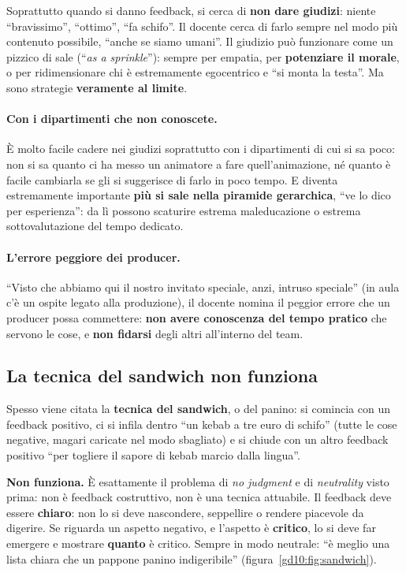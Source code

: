 Soprattutto quando si danno feedback, si cerca di \textbf{non dare
giudizi}: niente ``bravissimo'', ``ottimo'', ``fa schifo''. Il docente
cerca di farlo sempre nel modo più contenuto possibile, ``anche se siamo
umani''. Il giudizio può funzionare come un pizzico di sale (``\emph{as a
sprinkle}''): sempre per empatia, per \textbf{potenziare il morale}, o per
ridimensionare chi è estremamente egocentrico e ``si monta la testa''. Ma
sono strategie \textbf{veramente al limite}.

\paragraph{Con i dipartimenti che non conoscete.} È molto facile cadere nei
giudizi soprattutto con i dipartimenti di cui si sa poco: non si sa quanto
ci ha messo un animatore a fare quell'animazione, né quanto è facile
cambiarla se gli si suggerisce di farlo in poco tempo. E diventa
estremamente importante \textbf{più si sale nella piramide gerarchica}, ``ve
lo dico per esperienza'': da lì possono scaturire estrema maleducazione o
estrema sottovalutazione del tempo dedicato.

\paragraph{L'errore peggiore dei producer.} ``Visto che abbiamo qui il
nostro invitato speciale, anzi, intruso speciale'' (in aula c'è un
ospite legato alla produzione), il docente nomina il peggior errore che un
producer possa commettere: \textbf{non avere conoscenza del tempo pratico}
che servono le cose, e \textbf{non fidarsi} degli altri all'interno del team.

\subsection{La tecnica del sandwich non funziona}

Spesso viene citata la \textbf{tecnica del sandwich}, o del panino: si
comincia con un feedback positivo, ci si infila dentro ``un kebab a tre euro
di schifo'' (tutte le cose negative, magari caricate nel modo sbagliato) e si
chiude con un altro feedback positivo ``per togliere il sapore di kebab
marcio dalla lingua''.

\textbf{Non funziona.} È esattamente il problema di \emph{no judgment} e di
\emph{neutrality} visto prima: non è feedback costruttivo, non è una tecnica
attuabile. Il feedback deve essere \textbf{chiaro}: non lo si deve
nascondere, seppellire o rendere piacevole da digerire. Se riguarda un
aspetto negativo, e l'aspetto è \textbf{critico}, lo si deve far emergere e
mostrare \textbf{quanto} è critico. Sempre in modo neutrale: ``è meglio una
lista chiara che un pappone panino indigeribile''
(figura~\ref{gd10:fig:sandwich}).

